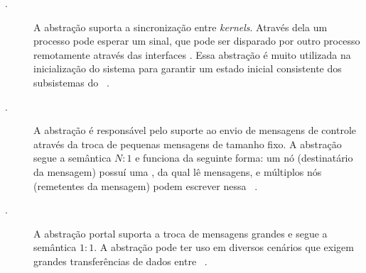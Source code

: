 \begin{description} 

    \item[\sync.] A abstração \sync suporta a sincronização entre \textit{kernels}. Através dela um processo pode esperar um sinal, que pode ser disparado por outro processo remotamente através das interfaces \noc. Essa abstração é muito utilizada na inicialização do sistema para garantir um estado inicial consistente dos subsistemas do \os~\cite{penna:thesis}.


%     

    \item[\mailbox.] A abstração \mailbox é responsável pelo suporte ao envio de mensagens de controle através da troca de pequenas mensagens de tamanho fixo. A abstração segue a semântica $N:1$ e funciona da seguinte forma: um nó (destinatário da mensagem) possuí uma \mailbox, da qual lê mensagens, e múltiplos nós (remetentes da mensagem) podem escrever nessa \mailbox~\cite{penna:thesis}.

%     

\item[\portal.] A abstração portal suporta a troca de mensagens grandes e segue a semântica $1:1$. A abstração pode ter uso em diversos cenários que exigem grandes transferências de dados entre \clusters~\cite{penna:thesis}.
\end{description}

